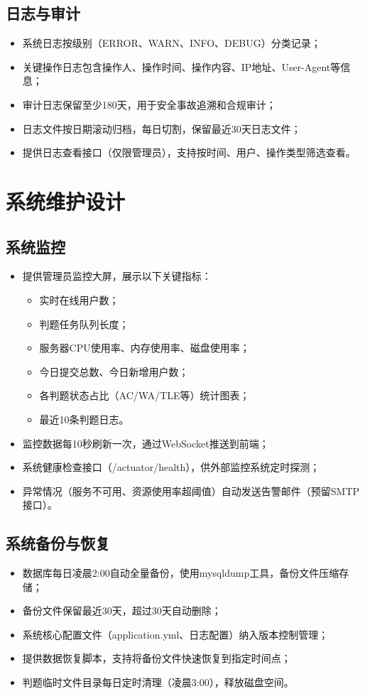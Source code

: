 \documentclass{../template/softeng}
\begin{document}
\subsection{日志与审计}
\begin{itemize}
	\item 系统日志按级别（ERROR、WARN、INFO、DEBUG）分类记录；
	\item 关键操作日志包含操作人、操作时间、操作内容、IP地址、User-Agent等信息；
	\item 审计日志保留至少180天，用于安全事故追溯和合规审计；
	\item 日志文件按日期滚动归档，每日切割，保留最近30天日志文件；
	\item 提供日志查看接口（仅限管理员），支持按时间、用户、操作类型筛选查看。
\end{itemize}

\section{系统维护设计}

\subsection{系统监控}
\begin{itemize}
	\item 提供管理员监控大屏，展示以下关键指标：
	\begin{itemize}
		\item 实时在线用户数；
		\item 判题任务队列长度；
		\item 服务器CPU使用率、内存使用率、磁盘使用率；
		\item 今日提交总数、今日新增用户数；
		\item 各判题状态占比（AC/WA/TLE等）统计图表；
		\item 最近10条判题日志。
	\end{itemize}
	\item 监控数据每10秒刷新一次，通过WebSocket推送到前端；
	\item 系统健康检查接口（/actuator/health），供外部监控系统定时探测；
	\item 异常情况（服务不可用、资源使用率超阈值）自动发送告警邮件（预留SMTP接口）。
\end{itemize}

\subsection{系统备份与恢复}
\begin{itemize}
	\item 数据库每日凌晨2:00自动全量备份，使用mysqldump工具，备份文件压缩存储；
	\item 备份文件保留最近30天，超过30天自动删除；
	\item 系统核心配置文件（application.yml、日志配置）纳入版本控制管理；
	\item 提供数据恢复脚本，支持将备份文件快速恢复到指定时间点；
	\item 判题临时文件目录每日定时清理（凌晨3:00），释放磁盘空间。
\end{itemize}
\end{document}
